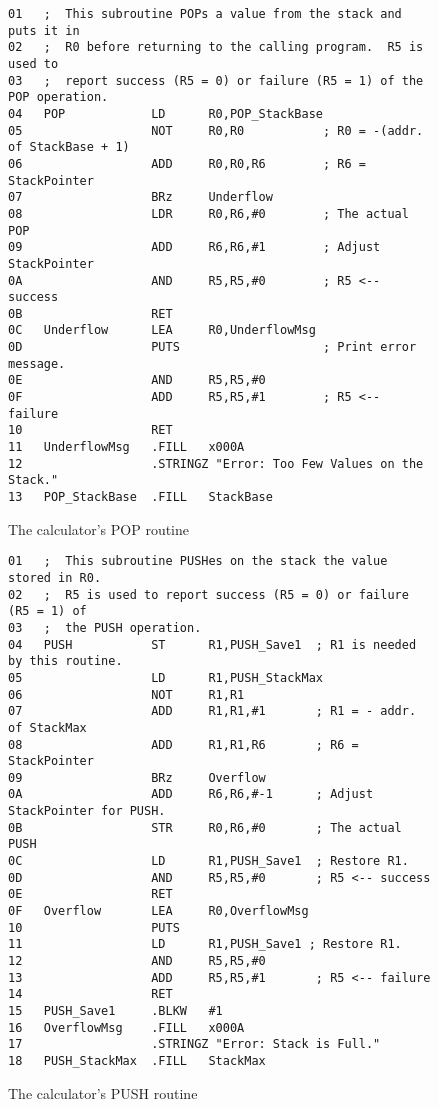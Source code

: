 \documentclass{patt}
\begin{document}
\begin{figure}
\begin{minipage}{36pc}
\begin{Verbatim}[fontsize=\fontsize{9}{10}\selectfont]
01   ;  This subroutine POPs a value from the stack and puts it in
02   ;  R0 before returning to the calling program.  R5 is used to
03   ;  report success (R5 = 0) or failure (R5 = 1) of the POP operation.
04   POP            LD      R0,POP_StackBase
05                  NOT     R0,R0           ; R0 = -(addr. of StackBase + 1)
06                  ADD     R0,R0,R6        ; R6 = StackPointer
07                  BRz     Underflow
08                  LDR     R0,R6,#0        ; The actual POP
09                  ADD     R6,R6,#1        ; Adjust StackPointer
0A                  AND     R5,R5,#0        ; R5 <-- success
0B                  RET
0C   Underflow      LEA     R0,UnderflowMsg 
0D                  PUTS                    ; Print error message.
0E                  AND     R5,R5,#0
0F                  ADD     R5,R5,#1        ; R5 <-- failure
10                  RET
11   UnderflowMsg   .FILL   x000A
12                  .STRINGZ "Error: Too Few Values on the Stack."
13   POP_StackBase  .FILL   StackBase 
\end{Verbatim}
\caption{The calculator's POP routine}
\label{fig:code.pop}
\end{minipage}
\end{figure}


\begin{figure}
\begin{minipage}{36pc}
\begin{Verbatim}[fontsize=\fontsize{9}{10}\selectfont]
01   ;  This subroutine PUSHes on the stack the value stored in R0.
02   ;  R5 is used to report success (R5 = 0) or failure (R5 = 1) of
03   ;  the PUSH operation.
04   PUSH           ST      R1,PUSH_Save1  ; R1 is needed by this routine.
05                  LD      R1,PUSH_StackMax
06                  NOT     R1,R1
07                  ADD     R1,R1,#1       ; R1 = - addr. of StackMax
08                  ADD     R1,R1,R6       ; R6 = StackPointer
09                  BRz     Overflow
0A                  ADD     R6,R6,#-1      ; Adjust StackPointer for PUSH.
0B                  STR     R0,R6,#0       ; The actual PUSH
0C                  LD      R1,PUSH_Save1  ; Restore R1.
0D                  AND     R5,R5,#0       ; R5 <-- success
0E                  RET
0F   Overflow       LEA     R0,OverflowMsg 
10                  PUTS
11                  LD      R1,PUSH_Save1 ; Restore R1.
12                  AND     R5,R5,#0
13                  ADD     R5,R5,#1       ; R5 <-- failure
14                  RET
15   PUSH_Save1     .BLKW   #1
16   OverflowMsg    .FILL   x000A
17                  .STRINGZ "Error: Stack is Full."
18   PUSH_StackMax  .FILL   StackMax
\end{Verbatim}
\caption{The calculator's PUSH routine}
\label{fig:code.push}
\end{minipage}
\end{figure}
\end{document}

